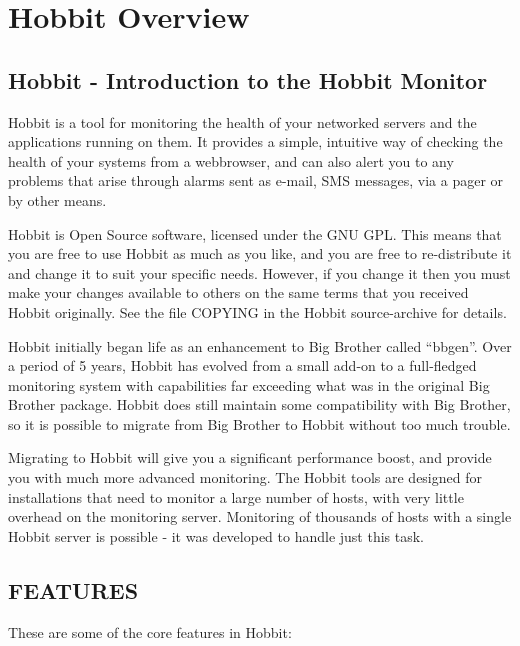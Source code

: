 %
\chapter{Hobbit Overview}
%
\section{Hobbit - Introduction to the Hobbit Monitor}

 Hobbit is a tool for monitoring the health of your networked servers
 and the applications running on them. It provides a simple, intuitive
 way of checking the health of your systems from a webbrowser, and can
 also alert you to any problems that arise through alarms sent as
 e-mail, SMS messages, via a pager or by other means. 


 Hobbit is Open Source software, licensed under the GNU GPL. This
 means that you are free to use Hobbit as much as you like, and you
 are free to re-distribute it and change it to suit your specific
 needs. However, if you change it then you must make your changes
 available to others on the same terms that you received Hobbit
 originally. See the file COPYING in the Hobbit source-archive for
 details. 

 Hobbit initially began life as an enhancement to Big Brother called
 ``bbgen''. Over a period of 5 years, Hobbit has evolved from a small
 add-on to a full-fledged monitoring system with capabilities far
 exceeding what was in the original Big Brother package. Hobbit does
 still maintain some compatibility with Big Brother, so it is
 possible to migrate from Big Brother to Hobbit without too much
 trouble. 

 Migrating to Hobbit will give you a significant performance boost,
 and provide you with much more advanced monitoring. The Hobbit tools
 are designed for installations that need to monitor a large number
 of hosts, with very little overhead on the monitoring
 server. Monitoring of thousands of hosts with a single Hobbit server
 is possible - it was developed to handle just this task. 

\section{FEATURES}
 These are some of the core features in Hobbit: 

